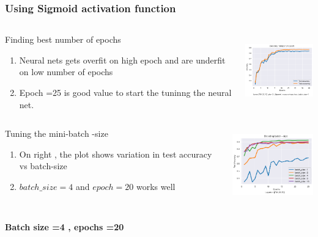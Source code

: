\documentclass[12pt,t]{beamer}
\begin{document}
\begin{frame}[t]
    \frametitle{Using Sigmoid activation function}

    \scriptsize

    \begin{columns}
        \begin{column}[T]{0.4\linewidth}
            \begin{block}{Finding best number of epochs}
                \begin{enumerate}
                    \item Neural nets gets overfit on high epoch and are underfit on low 
                    number of epochs
                    \item Epoch =25 is good value to start the tuninng the neural net.
                \end{enumerate}
            \end{block}
        \end{column}
        \begin{column}[T]{0.6\linewidth}
            \includegraphics[width=\linewidth,height=90pt]{sigmoid/epochs_variation.png}
        \end{column}
    \end{columns}
    \begin{columns}
        \begin{column}[T]{0.4\linewidth}
            \begin{block}{Tuning the mini-batch -size }
                \begin{enumerate}
                    \item On right , the plot shows variation in test accuracy vs batch-size
                    \item $batch\_size =4$ and $epoch =20$ works well
                \end{enumerate}
            \end{block}
        \end{column}
        \begin{column}[T]{0.6\linewidth}
            \includegraphics[width=\linewidth,height=90pt]{sigmoid/batch_variation.png}
        \end{column}
    \end{columns}

    \textbf{Batch size =4 , epochs =20}

    

\end{frame}
\end{document}
